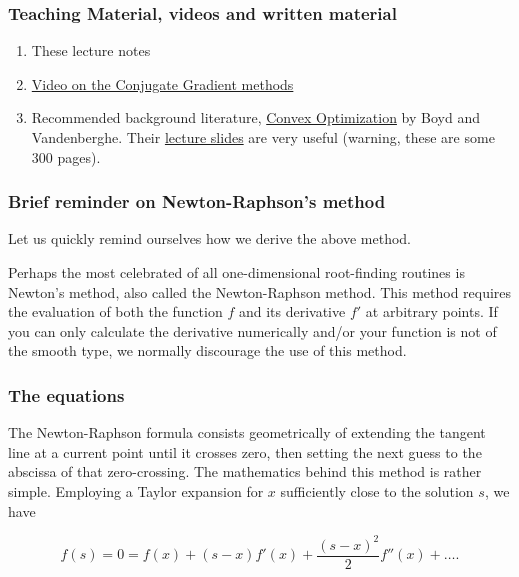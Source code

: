 \documentclass{beamer}
\begin{document}
\begin{frame}
\frametitle{Teaching Material, videos and written material}

\begin{block}{}
\begin{enumerate}
\item These lecture notes

\item \href{{https://www.youtube.com/watch?v=eAYohMUpPMA&ab_channel=TomCarlone}}{Video on the Conjugate Gradient methods}

\item Recommended background literature, \href{{https://web.stanford.edu/~boyd/cvxbook/}}{Convex Optimization} by Boyd and Vandenberghe. Their \href{{https://web.stanford.edu/~boyd/cvxbook/bv_cvxslides.pdf}}{lecture slides} are very useful (warning, these are some 300 pages).
\end{enumerate}

\noindent
\end{block}
\end{frame}

\begin{frame}
\frametitle{Brief reminder on Newton-Raphson's method}

Let us quickly remind ourselves how we derive the above method.

Perhaps the most celebrated of all one-dimensional root-finding
routines is Newton's method, also called the Newton-Raphson
method. This method  requires the evaluation of both the
function $f$ and its derivative $f'$ at arbitrary points. 
If you can only calculate the derivative
numerically and/or your function is not of the smooth type, we
normally discourage the use of this method.
\end{frame}

\begin{frame}
\frametitle{The equations}

The Newton-Raphson formula consists geometrically of extending the
tangent line at a current point until it crosses zero, then setting
the next guess to the abscissa of that zero-crossing.  The mathematics
behind this method is rather simple. Employing a Taylor expansion for
$x$ sufficiently close to the solution $s$, we have

\[
    f(s)=0=f(x)+(s-x)f'(x)+\frac{(s-x)^2}{2}f''(x) +\dots.
    \label{eq:taylornr}
\]
\end{frame}
\end{document}
